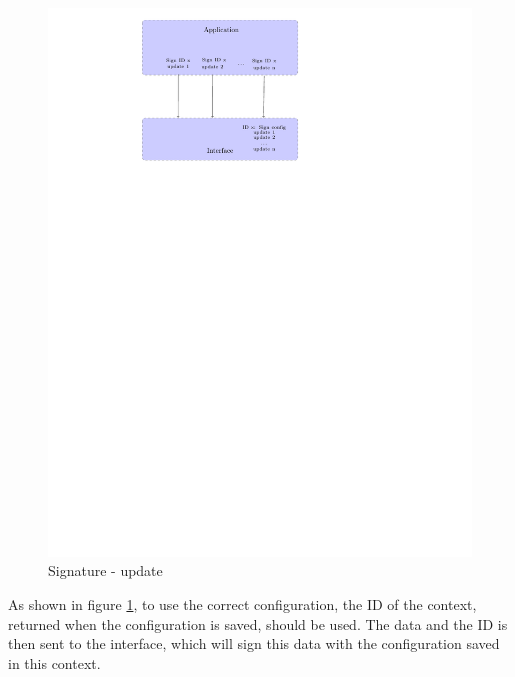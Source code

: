 \begin{figure}[!ht]
\centering
\includegraphics[trim=8cm 20cm 9.5cm 0cm]{figures/sign_example_update.pdf}
\caption{Signature - update\newline}
\label{fig:gci_sign_update}
\end{figure}

As shown in figure \ref{fig:gci_sign_update}, to use the correct configuration,
the ID of the context, returned when the configuration is saved, should be
used.
The data and the ID is then sent to the interface, which will sign this data
with the configuration saved in this context.


